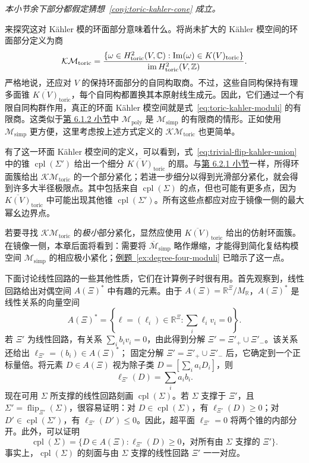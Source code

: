 \emph{本小节余下部分都假定猜想~\ref{conj:toric-kahler-cone} 成立。}

来探究这对 Kähler 模的环面部分意味着什么。将尚未扩大的 Kähler 模空间的环面部分定义为商
\begin{equation}\label{eq:toric-kahler-moduli}\index{环面 Kähler 模空间|hyperpage}
\mathcal{KM}_{\mathrm{toric}}
=\frac{\{\omega\in H_{\mathrm{toric}}^2(V,\mathbb C):
\operatorname{Im}(\omega)\in K(V)_{\mathrm{toric}}\}}
{\operatorname{im}H_{\mathrm{toric}}^2(V,\mathbb Z)}.
\end{equation}
严格地说，还应对 $V$ 的保持环面部分的自同构取商。不过，这些自同构保持有理多面锥 $\overline{K(V)}_{\mathrm{toric}}$，每个自同构都置换其本原射线生成元。因此，它们通过一个有限自同构群作用，真正的环面 Kähler 模空间就是式~\eqref{eq:toric-kahler-moduli} 的有限商。这类似于\hyperref[subsec:toric-complex-moduli]{第 6.1.2 小节}中 $\mathcal M_{\mathrm{poly}}$ 是 $\mathcal M_{\mathrm{simp}}$ 的有限商的情形。正如使用 $\mathcal M_{\mathrm{simp}}$ 更方便，这里考虑按上述方式定义的 $\mathcal{KM}_{\mathrm{toric}}$ 也更简单。

有了这一环面 Kähler 模空间的定义，可以看到，式~\eqref{eq:trivial-flip-kahler-union} 中的锥 $\operatorname{cpl}(\Sigma')$ 给出一个细分 $\overline{K(V)}_{\mathrm{toric}}$ 的扇。与\hyperref[subsec:large-radius-limits]{第 6.2.1 小节}一样，所得环面簇给出 $\mathcal{KM}_{\mathrm{toric}}$ 的一个部分紧化；若进一步细分以得到光滑部分紧化，就会得到许多大半径极限点。其中包括来自 $\operatorname{cpl}(\Sigma)$ 的点，但也可能有更多点，因为 $\overline{K(V)}_{\mathrm{toric}}$ 中可能出现其他锥 $\operatorname{cpl}(\Sigma')$。所有这些点都应对应于镜像一侧的最大幂幺边界点。

若要寻找 $\mathcal{KM}_{\mathrm{toric}}$ 的\emph{极小}部分紧化，显然应使用 $\overline{K(V)}_{\mathrm{toric}}$ 给出的仿射环面簇。在镜像一侧，本章后面将看到：需要将 $\overline{\mathcal M}_{\mathrm{simp}}$ 略作爆缩，才能得到简化复结构模空间 $\mathcal M_{\mathrm{simp}}$ 的相应极小紧化；\hyperref[ex:degree-four-moduli]{例题~\ref*{ex:degree-four-moduli}} 已暗示了这一点。

下面讨论线性回路的一些其他性质，它们在计算例子时很有用。首先观察到，线性回路给出对偶空间 $A(\Xi)^*$ 中有趣的元素。由于 $A(\Xi)=\mathbb R^\Xi/M_{\mathbb R}$，$A(\Xi)^*$ 是线性关系的向量空间
\[
A(\Xi)^*=\left\{\ell=(\ell_i)\in\mathbb R^\Xi:\sum_i\ell_i v_i=0\right\}.
\]
若 $\Xi'$ 为线性回路，有关系 $\sum_i b_i v_i=0$，由此得到分解 $\Xi'=\Xi'_+\cup\Xi'_-$。该关系还给出 $\ell_{\Xi'}=(b_i)\in A(\Xi)^*$；
固定分解 $\Xi'=\Xi'_+\cup\Xi'_-$ 后，它确定到一个正标量倍。将元素 $D\in A(\Xi)$ 视为除子类 $D=[\sum_i a_iD_i]$，则
\[
\ell_{\Xi'}(D)=\sum_i a_i b_i.
\]
现在可用 $\Sigma$ 所支撑的线性回路刻画 $\operatorname{cpl}(\Sigma)$。若 $\Sigma$ 支撑于 $\Xi'$，且 $\Sigma'=\operatorname{flip}_{\Xi'}(\Sigma)$，很容易证明：对 $D\in\operatorname{cpl}(\Sigma)$，有 $\ell_{\Xi'}(D)\geq0$；对 $D'\in\operatorname{cpl}(\Sigma')$，有 $\ell_{\Xi'}(D')\leq0$。因此，超平面 $\ell_{\Xi'}=0$ 将两个锥的内部分开。此外，可以证明
\[
\operatorname{cpl}(\Sigma)=\{D\in A(\Xi):\ell_{\Xi'}(D)\geq0
\text{，对所有由 }\Sigma\text{ 支撑的 }\Xi'\}.
\]
事实上，$\operatorname{cpl}(\Sigma)$ 的刻面与由 $\Sigma$ 支撑的线性回路 $\Xi'$ 一一对应。

